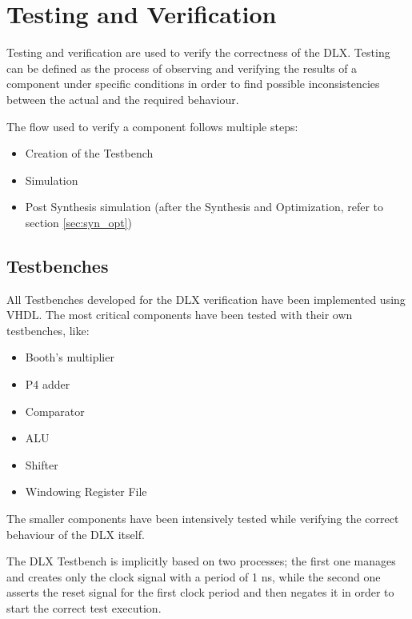 \chapter{Testing and Verification}
Testing and verification are used to verify the correctness of the DLX. Testing can be defined as the process of observing and verifying the results of a component under specific conditions in order to find possible inconsistencies between the actual and the required behaviour.

The flow used to verify a component follows multiple steps:
\begin{itemize}
	\itemsep0sp
	\item Creation of the Testbench
	\item Simulation
	\item Post Synthesis simulation (after the Synthesis and Optimization, refer to section \ref{sec:syn_opt})
\end{itemize}

\section{Testbenches}
All Testbenches developed for the DLX verification have been implemented using VHDL. The most critical components have been tested with their own testbenches, like:
\begin{itemize}
	\itemsep0sp
	\item Booth's multiplier
	\item P4 adder
	\item Comparator
	\item ALU
	\item Shifter
	\item Windowing Register File
\end{itemize}
The smaller components have been intensively tested while verifying the correct behaviour of the DLX itself.\newline\newline

The DLX Testbench is implicitly based on two processes; the first one manages and creates only the clock signal with a period of 1 ns, while the second one asserts the reset signal for the first clock period and then negates it in order to start the correct test execution.

